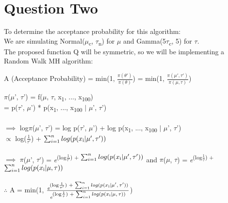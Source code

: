 \documentclass{article}
\begin{document}
\section{Question Two}
To determine the acceptance probability for this algorithm:\\
We are simulating Normal($\mu$\textsubscript{c}, $\tau$\textsubscript{n}) for $\mu$ and Gamma(5$\tau$\textsubscript{c}, 5) for $\tau$.\\
The proposed function Q will be symmetric, so we will be implementing a Random Walk MH algorithm:\\
\begin{center}
A (Acceptance Probability) = min(1, $\frac{\pi(\theta ')}{\pi(\theta)}$) = min(1, $\frac{\pi(\mu ', \tau ')}{\pi(\mu, \tau)}$)\\
\end{center}
$\pi$($\mu$', $\tau$') = f($\mu$, $\tau$, x\textsubscript{1}, ..., x\textsubscript{100})\\
= p($\tau$', $\mu$') * p(x\textsubscript{1}, ..., x\textsubscript{100} $\vert$ $\mu$', $\tau$')\\\\
$\implies$ log$\pi$($\mu$', $\tau$') = log p($\tau$', $\mu$') + log p(x\textsubscript{1}, ..., x\textsubscript{100} $\vert$ $\mu$', $\tau$')\\
$\propto$ log($\frac{1}{\tau '}$) + $\sum_{i=1}^{n} log(p(x\textsubscript{i} \vert \mu  ', \tau'))$\\\\
$\implies$ $\pi$($\mu$', $\tau$') = \textit{e}\textsuperscript{(log$\frac{1}{\tau '}$) + $\sum_{i=1}^{n} log(p(x\textsubscript{i} \vert \mu  ', \tau'))$} and $\pi$($\mu$, $\tau$) = \textit{e}\textsuperscript{(log$\frac{1}{\tau}$) + $\sum_{i=1}^{n} log(p(x\textsubscript{i} \vert \mu, \tau))$}\\\\
$\therefore$ A = min(1, $\frac{\textit{e}\textsuperscript{(log$\frac{1}{\tau '}$) + $\sum_{i=1}^{n} log(p(x\textsubscript{i} \vert \mu  ', \tau'))$}
}{\textit{e}\textsuperscript{(log$\frac{1}{\tau}$) + $\sum_{i=1}^{n} log(p(x\textsubscript{i} \vert \mu, \tau))$}}$)
\end{document}
